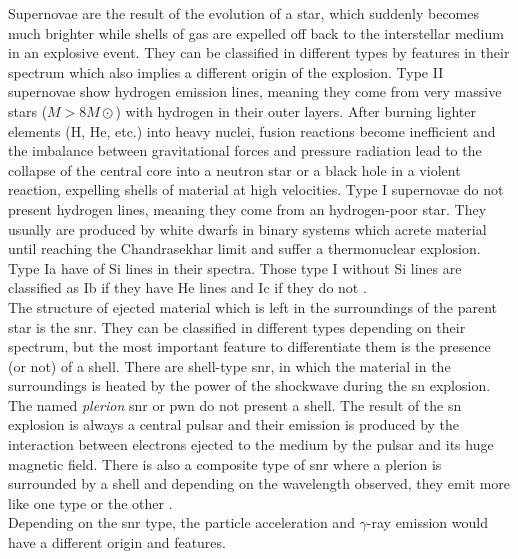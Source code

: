\documentclass[main.tex]{subfiles}
\begin{document}
Supernovae are the result of the evolution of a star, which suddenly becomes much brighter while shells of gas are expelled off back to the interstellar medium in an explosive event. They can be classified in different types by features in their spectrum which also implies a different origin of the explosion. Type II supernovae show hydrogen emission lines, meaning they come from very massive stars ($M > 8 M\odot$) with hydrogen in their outer layers. After burning lighter elements (H, He, etc.) into heavy nuclei, fusion reactions become inefficient and the imbalance between gravitational forces and pressure radiation lead to the collapse of the central core into a neutron star or a black hole in a violent reaction, expelling shells of material at high velocities. Type I supernovae do not present hydrogen lines, meaning they come from an hydrogen-poor star. They usually are produced by white dwarfs in binary systems which acrete material until reaching the Chandrasekhar limit \cite{1931Chandra} and suffer a thermonuclear explosion. Type Ia have of Si lines in their spectra. Those type I without Si lines are classified as Ib if they have He lines and Ic if they do not \cite{2006osterbrock}.\\
The structure of ejected material which is left in the surroundings of the parent star is the \gls{snr}. They can be classified in different types depending on their spectrum, but the most important feature to differentiate them is the presence (or not) of a shell. There are shell-type \gls{snr}, in which the material in the surroundings is heated by the power of the shockwave during the \gls{sn} explosion. The named \textit{plerion} \gls{snr} or \gls{pwn} do not present a shell. The result of the \gls{sn} explosion is always a central pulsar and their emission is produced by the interaction between electrons ejected to the medium by the pulsar and its huge magnetic field. There is also a composite type of \gls{snr} where a plerion is surrounded by a shell and depending on the wavelength observed, they emit more like one type or the other \cite{1988SNR}.\\
Depending on the \gls{snr} type, the  particle acceleration and $\gamma$-ray emission would have a different origin and features.\\
\end{document}
